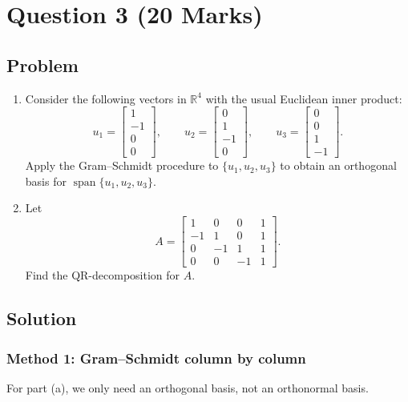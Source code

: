 \documentclass[12pt]{article}
\newcommand{\R}{\mathbb{R}}
\newcommand{\Span}{\operatorname{span}}
\begin{document}
\newpage
\section{Question 3 \hfill (20 Marks)}

\subsection{Problem}
\begin{enumerate}[label=(\alph*)]
  \item Consider the following vectors in $\R^4$ with the usual Euclidean inner product:
  \[
  u_1=\begin{bmatrix}1\\-1\\0\\0\end{bmatrix},
  \qquad
  u_2=\begin{bmatrix}0\\1\\-1\\0\end{bmatrix},
  \qquad
  u_3=\begin{bmatrix}0\\0\\1\\-1\end{bmatrix}.
  \]
  Apply the Gram--Schmidt procedure to $\{u_1,u_2,u_3\}$ to obtain an orthogonal basis for $\Span\{u_1,u_2,u_3\}$.
  \item Let
  \[
  A=\begin{bmatrix}
  1&0&0&1\\
  -1&1&0&1\\
  0&-1&1&1\\
  0&0&-1&1
  \end{bmatrix}.
  \]
  Find the QR-decomposition for $A$.
\end{enumerate}

\subsection{Solution}

\subsubsection{Method 1: Gram--Schmidt column by column}

For part (a), we only need an orthogonal basis, not an orthonormal basis.
\end{document}
